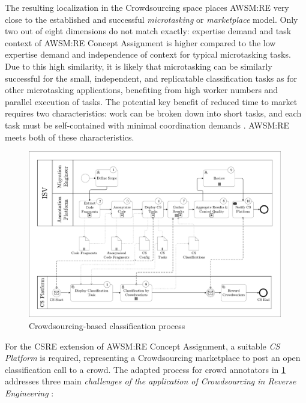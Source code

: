 The resulting localization in the \gls{Crowdsourcing} space places AWSM:RE very close to the established and successful \emph{microtasking} \autocite{Latoza2016} or \emph{marketplace} \autocite{Daniel2018CrowdsourcingQuality} model.
Only two out of eight dimensions do not match exactly: expertise demand and task context of AWSM:RE \gls{Concept Assignment} is higher compared to the low expertise demand and independence of context for typical microtasking tasks.
Due to this high similarity, it is likely that microtasking can be similarly successful for the small, independent, and replicatable classification tasks as for other microtasking applications, benefiting from high worker numbers and parallel execution of tasks.
The potential key benefit of reduced time to market requires two characteristics: work can be broken down into short tasks, and each task must be self-contained with minimal coordination demands \autocite{Latoza2016}.
AWSM:RE meets both of these characteristics.

\begin{figure}[h!]
\hypertarget{fig:crowdprocess}{%
\centering
\includegraphics[width=0.99\textwidth]{../figures/crowdprocess.pdf}
\caption[Crowdsourcing-based classification process]{Crowdsourcing-based classification process\\ \autocite[adapted from][]{Heil2019CSRECCIS}}\label{fig:crowdprocess}
}
\end{figure}

For the CSRE extension \autocite{Heil2019CSRECCIS} of AWSM:RE \gls{Concept Assignment}, a suitable \emph{CS Platform} is required, representing a \gls{Crowdsourcing} marketplace to post an open classification call to a crowd.
The adapted process for crowd annotators in \cref{fig:crowdprocess} addresses three main \emph{challenges of the application of \gls{Crowdsourcing} in \gls{Reverse Engineering}} \autocite{Heil2019CSRECCIS}:

